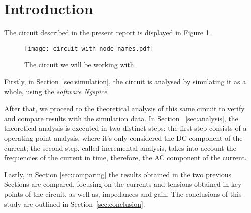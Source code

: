 \newpage
\section{Introduction}
\label{sec:introduction}



The circuit described in the present report is displayed in Figure \ref{fig:circuit}.

\begin{figure}[h] \centering
\texttt{[image: circuit-with-node-names.pdf]}
\caption{The circuit we will be working with.}
\label{fig:circuit}
\end{figure}


Firstly, in Section~\ref{sec:simulation}, the circuit is analysed by simulating it as a whole, using the \textit{software Ngspice}.

After that, we proceed to the theoretical analysis of this same circuit to verify and compare results with the simulation data. In Section ~\ref{sec:analysis}, the theoretical analysis is executed in two distinct steps: the first step consists of a operating point analysis, where it's only considered the DC component of the current; the second step, called incremental analysis, takes into account the frequencies of the current in time, therefore, the AC component of the current.

Lastly, in Section \ref{sec:comparing} the results obtained in the two previous Sections are compared, focusing on the currents and tensions obtained in key points of the circuit. as well as, impedances and gain.
The conclusions of this study are outlined in Section~\ref{sec:conclusion}.